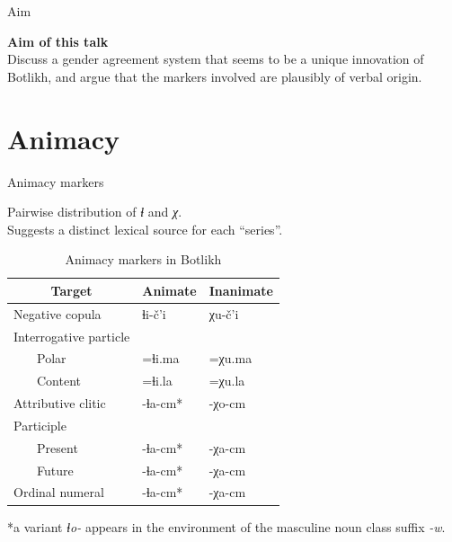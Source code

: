 \begin{frame}{Aim}

\begin{center}
  \color{darkscarlet}\textbf{Aim of this talk} \\ \color{black}Discuss a gender agreement system that seems to be a unique innovation of Botlikh, and argue that the markers involved are plausibly of verbal origin.
\end{center}
    
\end{frame}


\section{Animacy}
\begin{frame}{Animacy markers}

Pairwise distribution of \textit{ɬ} and \textit{χ}. \\ 
Suggests a distinct lexical source for each ``series''.

\begin{table}[H]
\caption{Animacy markers in Botlikh}
\begin{center}
\label{tab:animparad}
\begin{tabular}{llll}
\multicolumn{2}{c}{Target}                 & \multicolumn{1}{c}{Animate} & \multicolumn{1}{c}{Inanimate} \\ \hline
\multicolumn{2}{l}{Negative copula}        & ɬi-č'i                      & χu-č'i                        \\
\multicolumn{2}{l}{Interrogative particle} &                             &                               \\
                  & Polar                  & =ɬi.ma                      & =χu.ma                        \\
                  & Content                & =ɬi.la                      & =χu.la                        \\
\multicolumn{2}{l}{Attributive clitic}     & -ɬa-cm*                     & -χo-cm                        \\
\multicolumn{2}{l}{Participle}             &                             &                               \\
                  & Present                & -ɬa-cm*                     & -χa-cm                        \\
                  & Future                 & -ɬa-cm*                     & -χa-cm                        \\
\multicolumn{2}{l}{Ordinal numeral}        & -ɬa-cm*                     & -χa-cm                       
\end{tabular}
\end{center}
\end{table}
\begin{center}
\tiny{*a variant \textit{ɬo-} appears in the environment of the masculine noun class suffix \textit{-w}.}
\end{center}
\end{frame}

